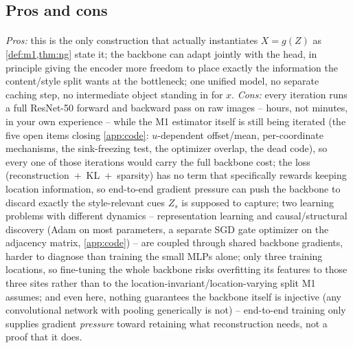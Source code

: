 \subsection{Pros and cons}

\paragraph{}
\emph{Pros:} this is the only construction that actually instantiates $X=g(Z)$ as \cref{def:m1,thm:ng}
state it; the backbone can adapt jointly with the head, in principle giving the encoder more freedom to
place exactly the information the content/style split wants at the bottleneck; one unified model, no
separate caching step, no intermediate object standing in for $x$.
\emph{Cons:} every iteration runs a full ResNet-50 forward and backward pass on raw images -- hours,
not minutes, in your own experience -- while the M1 estimator itself is still being iterated (the
five open items closing \cref{app:code}: $u$-dependent offset/mean, per-coordinate mechanisms, the
sink-freezing test, the optimizer overlap, the dead code), so every one of those iterations would
carry the full backbone cost; the loss (\mbox{reconstruction + KL + sparsity}) has no term that 
specifically rewards keeping location information, so end-to-end gradient pressure can push the backbone 
to discard exactly the style-relevant cues $Z_s$ is supposed to capture; two learning problems with
different dynamics -- representation learning and causal/structural discovery (Adam on most
parameters, a separate SGD gate optimizer on the adjacency matrix, \cref{app:code}) -- are coupled
through shared backbone gradients, harder to diagnose than training the small MLPs alone; only three
training locations, so fine-tuning the whole backbone risks overfitting its features to those three
sites rather than to the location-invariant/location-varying split M1 assumes; and even here, nothing
guarantees the backbone itself is injective (any convolutional network with pooling generically is
not) -- end-to-end training only supplies gradient \emph{pressure} toward retaining what reconstruction
needs, not a proof that it does.

